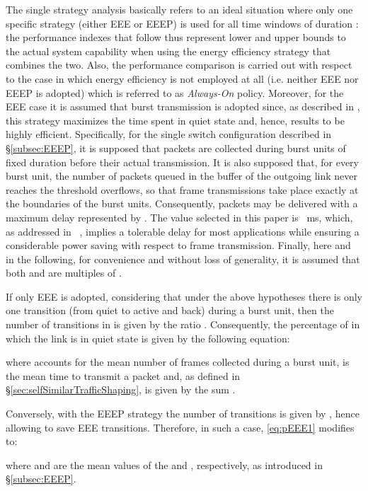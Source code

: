 \documentclass[journal,10pt,twoside,final]{IEEEtran}
\begin{document}
The single strategy analysis basically refers to an ideal situation where only one specific strategy (either EEE or EEEP) is used for all time windows of duration : the performance indexes that follow thus represent lower and upper bounds to the actual system capability when using the energy efficiency strategy that combines the two. Also, the performance comparison is carried out with respect to the case in which energy efficiency is not employed at all (i.e. neither EEE nor EEEP is adopted) which is referred to as \emph{Always-On} policy. Moreover, for the EEE case it is assumed that burst transmission is adopted since, as described in \cite{ReviriegoMaestroHernandez10}, this strategy maximizes the time spent in quiet state and, hence, results to be highly efficient. Specifically, for the single switch configuration described in \S\ref{subsec:EEEP}, it is supposed that packets are collected during burst units of fixed duration  before their actual transmission. It is also supposed that, for every burst unit, the number of packets queued in the buffer of the outgoing link never reaches the threshold overflows, so that frame transmissions take place exactly at the boundaries of the burst units. Consequently, packets may be delivered with a maximum delay represented by . The value selected in this paper is ~ms, which, as addressed in ~\cite{ReviriegoMaestroHernandez10}, implies a tolerable delay for most applications while ensuring a considerable power saving with respect to frame transmission.
Finally, here and in the following, for convenience and without loss of generality, it is assumed that both  and  are multiples of .

If only EEE is adopted, considering that under the above hypotheses there is only one transition (from quiet to active and back) during a burst unit, then the number of transitions in  is given by the ratio . Consequently, the percentage of  in which the link is in quiet state is given by the following equation:

where  accounts for the mean number of frames collected during a burst unit,  is the mean time to transmit a packet and, as defined in \S\ref{sec:selfSimilarTrafficShaping},  is given by the sum . 

Conversely, with the EEEP strategy the number of transitions is given by , hence  allowing to save  EEE transitions. Therefore, in such a case, \eqref{eq:pEEE1} modifies to:

where  and  are the mean values of the  and , respectively, as introduced in \S\ref{subsec:EEEP}.
\end{document}
